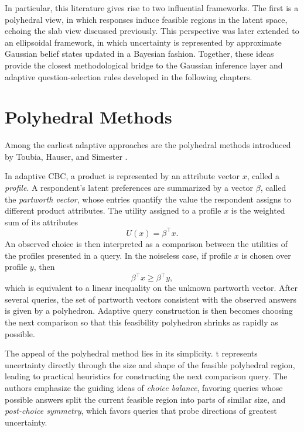 \documentclass{article}
\begin{document}
In particular, this literature gives rise to two influential frameworks. The first
is a polyhedral view, in which responses induce feasible regions in the latent
space, echoing the slab view discussed previously. This perspective was later extended to an ellipsoidal framework, in which
uncertainty is represented by approximate Gaussian belief states updated in a
Bayesian fashion. Together, these ideas provide the closest methodological bridge
to the Gaussian inference layer and adaptive question-selection rules developed in
the following chapters.

\section{Polyhedral Methods}

Among the earliest adaptive approaches are the polyhedral methods introduced by
Toubia, Hauser, and Simester \cite{poly}. 

In adaptive CBC, a product is represented
by an attribute vector \(x\), called a \emph{profile}. A respondent's latent
preferences are summarized by a vector \(\beta\), called the \emph{partworth
vector}, whose entries quantify the value the respondent assigns to different
product attributes. The
utility assigned to a profile \(x\) is the weighted sum of its attributes
\[
U(x)=\beta^\top x.
\]
An observed choice is then interpreted as a comparison between the utilities
of the profiles presented in a query.
In the noiseless case, if profile \(x\) is chosen over profile \(y\), then
\begin{equation}
    \beta^\top x \ge \beta^\top y,
\end{equation}
which is equivalent to a linear inequality on the unknown partworth vector. After
several queries, the set of partworth vectors consistent with the observed answers
is given by a polyhedron. Adaptive query
construction is then becomes choosing the next comparison so that this
feasibility polyhedron shrinks as rapidly as possible.

The appeal of the polyhedral method lies in its simplicity. t represents
uncertainty directly through the size and shape of the feasible polyhedral region, leading to practical heuristics for
constructing the next comparison query. The authors emphasize the guiding
ideas of \emph{choice balance}, favoring queries whose possible answers split the current feasible region into parts of similar size, and \emph{post-choice symmetry}, which favors queries that probe directions of greatest
uncertainty.
\end{document}
